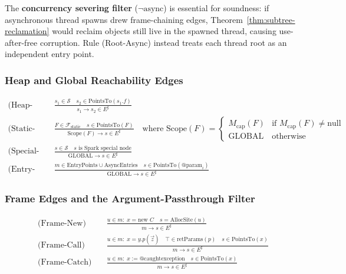 \documentclass[12pt,a4paper]{article}
\newcommand{\GLOBAL}{\text{GLOBAL}}
\newcommand{\PointsTo}{\text{PointsTo}}
\newcommand{\retParams}{\text{retParams}}
\begin{document}
The \textbf{concurrency severing filter} ($\neg\text{async}$) is essential for soundness: if asynchronous thread spawns drew frame-chaining edges, Theorem~\ref{thm:subtree-reclamation} would reclaim objects still live in the spawned thread, causing use-after-free corruption. Rule (Root-Async) instead treats each thread root as an independent entry point.

\subsubsection{Heap and Global Reachability Edges}

\begin{align}
\text{(Heap-Field)} \quad & \frac{s_1 \in \mathcal{S} \quad s_2 \in \PointsTo(s_1.f)}{s_1 \to s_2 \in E^\sharp} \\[1ex]
\text{(Static-Field)} \quad & \frac{F \in \mathcal{F}_{\text{static}} \quad s \in \PointsTo(F)}{\text{Scope}(F) \to s \in E^\sharp} \quad \text{where } \text{Scope}(F) = \begin{cases} M_{\text{cap}}(F) & \text{if } M_{\text{cap}}(F) \neq \text{null} \\ \GLOBAL & \text{otherwise} \end{cases} \\[1ex]
\text{(Special-Sink)} \quad & \frac{s \in \mathcal{S} \quad s \text{ is Spark special node}}{\GLOBAL \to s \in E^\sharp} \\[1ex]
\text{(Entry-Param)} \quad & \frac{m \in \text{EntryPoints} \cup \text{AsyncEntries} \quad s \in \PointsTo(@\text{param}_i)}{\GLOBAL \to s \in E^\sharp}
\end{align}

\subsubsection{Frame Edges and the Argument-Passthrough Filter}

\begin{align}
\text{(Frame-New)} \quad & \frac{u \in m: \; x = \text{new } C \quad s = \text{AllocSite}(u)}{m \to s \in E^\sharp} \\[1ex]
\text{(Frame-Call)} \quad & \frac{u \in m: \; x = y.p(\vec{z}) \quad \top \in \retParams(p) \quad s \in \PointsTo(x)}{m \to s \in E^\sharp} \\[1ex]
\text{(Frame-Catch)} \quad & \frac{u \in m: \; x := @\text{caughtexception} \quad s \in \PointsTo(x)}{m \to s \in E^\sharp}
\end{align}
\end{document}
